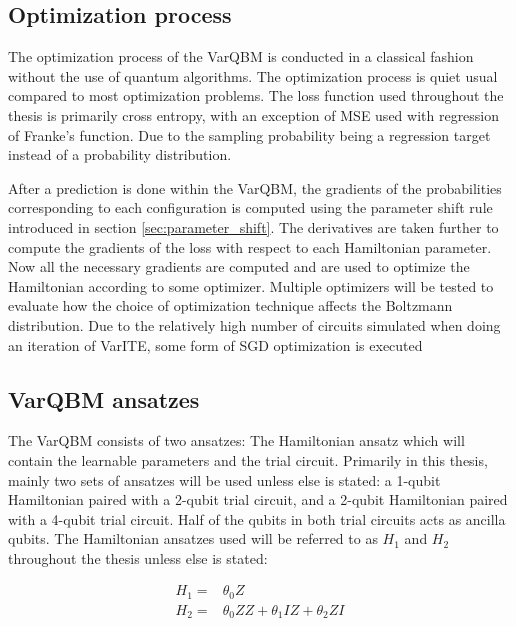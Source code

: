 \documentclass[../main.tex]{subfiles}
\begin{document}
\subsection{Optimization process}
The optimization process of the VarQBM is conducted in a classical fashion without the use of quantum algorithms. The optimization process is quiet usual compared to most optimization problems. The loss function used throughout the thesis is primarily cross entropy, with an exception of MSE used with regression of Franke's function. Due to the sampling probability being a regression target instead of a probability distribution.

After a prediction is done within the VarQBM, the gradients of the probabilities corresponding to each configuration is computed using the parameter shift rule introduced in section \ref{sec:parameter_shift}. The derivatives are taken further to compute the gradients of the loss with respect to each Hamiltonian parameter. Now all the necessary gradients are computed and are used to optimize the Hamiltonian according to some optimizer. Multiple optimizers will be tested to evaluate how the choice of optimization technique affects the Boltzmann distribution. Due to the relatively high number of circuits simulated when doing an iteration of VarITE, some form of SGD optimization is executed


\FloatBarrier
\subsection{VarQBM ansatzes}
\label{sec:hamiltonian_ansatzes}
The VarQBM consists of two ansatzes: The Hamiltonian ansatz which will contain the learnable parameters and the trial circuit. Primarily in this thesis, mainly two sets of ansatzes will be used unless else is stated: a 1-qubit Hamiltonian paired with a 2-qubit trial circuit, and a 2-qubit Hamiltonian paired with a 4-qubit trial circuit. Half of the qubits in both trial circuits acts as ancilla qubits. The Hamiltonian ansatzes used will be referred to as $H_1$ and $H_2$ throughout the thesis unless else is stated:

\begin{equation*}
\begin{aligned}
H_1=&\theta_{0} Z \\
H_2=&\theta_{0} Z Z+\theta_{1} I Z+\theta_{2} Z I
\end{aligned}
\end{equation*}
\end{document}
